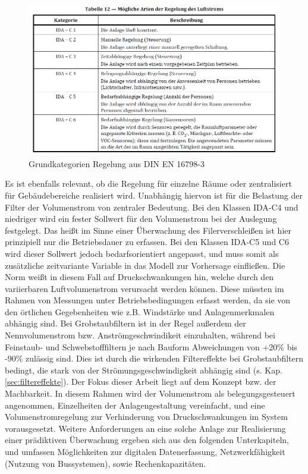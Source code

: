 \begin{figure}[H]
    \begin{center}
        \includegraphics[width=\linewidth]{images/arten_regelung.png}
        \caption[Regelungsarten Luftstrom]{Grundkategorien Regelung aus DIN EN 16798-3 \cite{16798} }
        \label{fi:regelungsarten}
    \end{center}
\end{figure}
Es ist ebenfalls relevant, ob die Regelung für einzelne Räume oder zentralisiert für Gebäudebereiche realisiert wird. Unabhängig hiervon ist für die Belastung der Filter der Volumenstrom von zentraler Bedeutung. Bei den Klassen IDA-C4 und niedriger wird ein fester Sollwert für den Volumenstrom bei der Auslegung festgelegt. Das heißt im Sinne einer Überwachung des Filerverschleißen ist hier prinzipiell nur die Betriebsdauer zu erfassen. Bei den Klassen IDA-C5 und C6 wird dieser Sollwert jedoch bedarfsorientiert angepasst, und muss somit als zusätzliche zeitvariante Variable in das Modell zur Vorhersage einfließen. Die Norm weißt in diesem Fall auf Druckschwankungen hin, welche durch den variierbaren Luftvolumenstrom verursacht werden können. \cite{16798} Diese müssten im Rahmen von Messungen unter Betriebsbedingungen erfasst werden, da sie von den örtlichen Gegebenheiten wie z.B. Windstärke und Anlagenmerkmalen abhängig sind. \newline
Bei Grobstaubfiltern ist in der Regel außerdem der Nennvolumenstrom bzw. Anströmgeschwindikeit einzuhalten, während bei Feinstaub- und Schwebstofffiltern je nach Bauform Abweichungen von +20\% bis -90\% zulässig sind.\cite{Grundlagen_Filtertechnik} Dies ist durch die wirkenden Filtereffekte bei Grobstaubfiltern bedingt, die stark von der Strömungsgeschwindigkeit abhängig sind (s. Kap. \ref{sec:filtereffekte}).
Der Fokus dieser Arbeit liegt auf dem Konzept bzw. der Machbarkeit. In diesem Rahmen wird der Volumenstrom als belegungsgesteuert angenommen, Einzelheiten der Anlagengestaltung vereinfacht, und eine Volumenstromregelung zur Verhinderung von Druckschwankungen im System vorausgesetzt. Weitere Anforderungen an eine solche Anlage zur Realisierung einer prädiktiven Überwachung ergeben sich aus den folgenden Unterkapiteln, und umfassen Möglichkeiten zur digitalen Datenerfassung, Netzwerkfähigkeit (Nutzung von Bussystemen), sowie Rechenkapazitäten.
